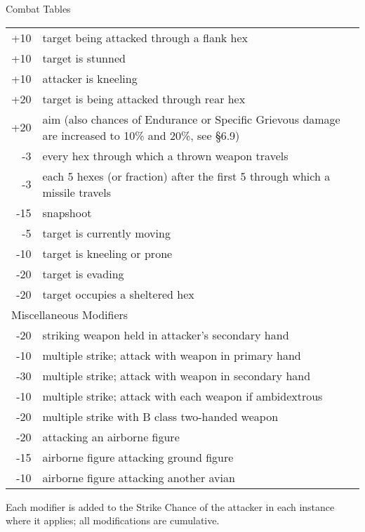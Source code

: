 \begin{Tables}{Combat Tables}
\begin{multicols}{3}
\begin{tabularx}{\columnwidth}{rX}
+10	& target being attacked through a flank hex \\
+10	& target is stunned \\
+10	& attacker is kneeling \\
+20	& target is being attacked through rear hex \\
+20	& aim (also chances of Endurance or Specific Grievous damage are increased to 10\% and 20\%, see §6.9) \\
-3	& every hex through which a thrown weapon travels \\
-3	& each 5 hexes (or fraction) after the first 5 through which a missile travels \\
-15	& snapshoot \\
-5	& target is currently moving \\
-10	& target is kneeling or prone \\
-20	& target is evading \\
-20	& target occupies a sheltered hex \\
\multicolumn{2}{l}{Miscellaneous Modifiers} \\
-20	& striking weapon held in attacker’s secondary hand \\
-10	& multiple strike; attack with weapon in primary hand \\
-30	& multiple strike; attack with weapon in secondary hand \\
-10	& multiple strike; attack with each weapon if ambidextrous \\
-20	& multiple strike with B class two-handed weapon \\
-20	& attacking an airborne figure \\
-15	& airborne figure attacking ground figure \\
-10	& airborne figure attacking another avian \\
\end{tabularx}
Each modifier is added to the Strike Chance of the attacker in each
instance where it applies; all modifications are cumulative.

\columnbreak


\end{multicols}
\end{Tables}

